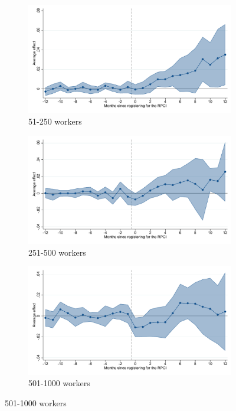 \clearpage

\begin{figure}[H]
    \centering
    \ContinuedFloat
    \caption{(Cont.) Event studies - RPCI effect on log wages}

    \begin{subfigure}{0.32\textwidth}
    \caption{51-250 workers}
    \includegraphics[width=\textwidth]{04_Figures/muestra_10porciento/event_study_log_sal_cierre_size_51_dcdh_connected.pdf}
    \end{subfigure}
    \begin{subfigure}{0.32\textwidth}
    \caption{251-500 workers}
    \includegraphics[width=\textwidth]{04_Figures/muestra_10porciento/event_study_log_sal_cierre_size_251_dcdh_connected.pdf}
    \end{subfigure}
    \begin{subfigure}{0.32\textwidth}
    \caption{501-1000 workers}
    \includegraphics[width=\textwidth]{04_Figures/muestra_10porciento/event_study_log_sal_cierre_size_501_dcdh_connected.pdf}
    \end{subfigure}
    

\end{figure}
